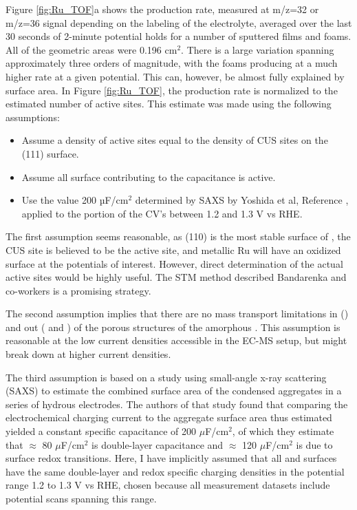 Figure \ref{fig:Ru_TOF}a shows the  production rate, measured at m/z=32 or m/z=36 signal depending on the labeling of the electrolyte, averaged over the last 30 seconds of 2-minute potential holds for a number of  sputtered films and  foams. All of the geometric areas were 0.196 cm$^2$. There is a large variation spanning approximately three orders of magnitude, with the  foams producing  at a much higher rate at a given potential. This can, however, be almost fully explained by surface area. In Figure \ref{fig:Ru_TOF}, the  production rate is normalized to the estimated number of active sites. This estimate was made using the following assumptions:

\begin{itemize}
	
	\item Assume a density of active sites equal to the density of CUS sites on the (111) surface.
	
	\item Assume all surface contributing to the capacitance is active.
		
	\item Use the value 200 $µ$F/cm$^2$ determined by SAXS by Yoshida et al, Reference , applied to the portion of the CV's between 1.2 and 1.3 V vs RHE.
\end{itemize}

The first assumption seems reasonable, as (110) is the most stable surface of , the CUS site is believed to be the active site\cite{Reier2017, Rao2017a}, and metallic Ru will have an oxidized surface at the potentials of interest. However, direct determination of the actual active sites would be highly useful. The STM method described Bandarenka and co-workers is a promising strategy\cite{Pfisterer2017}.

The second assumption implies that there are no mass transport limitations in () and out ( and ) of the porous structures of the amorphous . This assumption is reasonable at the low current densities accessible in the EC-MS setup, but might break down at higher current densities. 

The third assumption is based on a study using small-angle x-ray scattering (SAXS) to estimate the combined surface area of the condensed  aggregates in a series of hydrous  electrodes\cite{Yoshida2013}. The authors of that study found that comparing the electrochemical charging current to the aggregate surface area thus estimated yielded a constant specific capacitance of 200 $\mu$F/cm$^2$, of which they estimate that $\approx$ 80 $\mu$F/cm$^2$ is double-layer capacitance and $\approx$ 120 $\mu$F/cm$^2$ is due to surface redox transitions. Here, I have implicitly assumed that all  and  surfaces have the same double-layer and redox specific charging densities in the potential range 1.2 to 1.3 V vs RHE, chosen because all measurement datasets include potential scans spanning this range.

